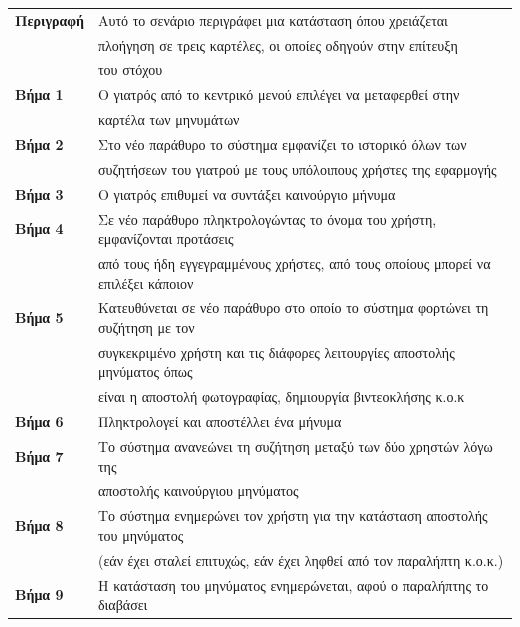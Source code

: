 \documentclass{article}
\newcommand\T{\rule{0pt}{2.6ex}}       %
\newcommand\B{\rule[-1.2ex]{0pt}{0pt}}
\begin{document}
 \begin{center}
     \begin{tabular}{|l|l|}
     \hline
      \textbf{Περιγραφή} & Αυτό το σενάριο περιγράφει μια κατάσταση όπου χρειάζεται \T \\& πλοήγηση σε τρεις καρτέλες, οι οποίες οδηγούν στην επίτευξη \\& του στόχου \B \\ 
      \hline
      \textbf{Βήμα 1} & Ο γιατρός από το κεντρικό μενού επιλέγει να μεταφερθεί στην \T \\& καρτέλα των μηνυμάτων \B \\
      \hline
      \textbf{Βήμα 2} & Στο νέο παράθυρο το σύστημα εμφανίζει το ιστορικό όλων των \T \\& συζητήσεων του γιατρού με τους υπόλοιπους χρήστες της εφαρμογής \B \\
      \hline
      \textbf{Βήμα 3} & Ο γιατρός επιθυμεί να συντάξει καινούργιο μήνυμα \T\B \\
      \hline
      \textbf{Βήμα 4} & Σε νέο παράθυρο πληκτρολογώντας το όνομα του χρήστη, εμφανίζονται προτάσεις \T \\& από τους ήδη εγγεγραμμένους χρήστες, από τους οποίους μπορεί να επιλέξει κάποιον  \B \\
      \hline
      \textbf{Βήμα 5} & Κατευθύνεται σε νέο παράθυρο στο οποίο το σύστημα φορτώνει τη συζήτηση με τον \T \\& συγκεκριμένο χρήστη και τις διάφορες λειτουργίες αποστολής μηνύματος όπως \\& είναι η αποστολή φωτογραφίας, δημιουργία βιντεοκλήσης κ.ο.κ  \B \\
      \hline
      \textbf{Βήμα 6} & Πληκτρολογεί και αποστέλλει ένα μήνυμα \T\B \\
      \hline
      \textbf{Βήμα 7} & Το σύστημα ανανεώνει τη συζήτηση μεταξύ των δύο χρηστών λόγω της \T \\& αποστολής καινούργιου μηνύματος \B \\
      \hline
      \textbf{Βήμα 8} & Το σύστημα ενημερώνει τον χρήστη για την κατάσταση αποστολής του μηνύματος \T \\& (εάν έχει σταλεί επιτυχώς, εάν έχει ληφθεί από τον παραλήπτη κ.ο.κ.) \B \\
      \hline
      \textbf{Βήμα 9} & Η κατάσταση του μηνύματος ενημερώνεται, αφού ο παραλήπτης το διαβάσει \T\B \\
      \hline
     \end{tabular}
 \end{center}
 
\end{document}
